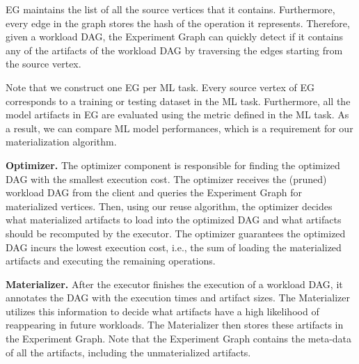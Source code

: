 EG maintains the list of all the source vertices that it contains.
Furthermore, every edge in the graph stores the hash of the operation it represents.
Therefore, given a workload DAG, the Experiment Graph can quickly detect if it contains any of the artifacts of the workload DAG by traversing the edges starting from the source vertex.

Note that we construct one EG per ML task.
Every source vertex of EG corresponds to a training or testing dataset in the ML task.
Furthermore, all the model artifacts in EG are evaluated using the metric defined in the ML task.
As a result, we can compare ML model performances, which is a requirement for our materialization algorithm.

\textbf{Optimizer. }
The optimizer component is responsible for finding the optimized DAG with the smallest execution cost.
The optimizer receives the (pruned) workload DAG from the client and queries the Experiment Graph for materialized vertices.
Then, using our reuse algorithm, the optimizer decides what materialized artifacts to load into the optimized DAG and what artifacts should be recomputed by the executor.
The optimizer guarantees the optimized DAG incurs the lowest execution cost, i.e., the sum of loading the materialized artifacts and executing the remaining operations.

\textbf{Materializer.}
After the executor finishes the execution of a workload DAG, it annotates the DAG with the execution times and artifact sizes.
The Materializer utilizes this information to decide what artifacts have a high likelihood of reappearing in future workloads.
The Materializer then stores these artifacts in the Experiment Graph.
Note that the Experiment Graph contains the meta-data of all the artifacts, including the unmaterialized artifacts.



